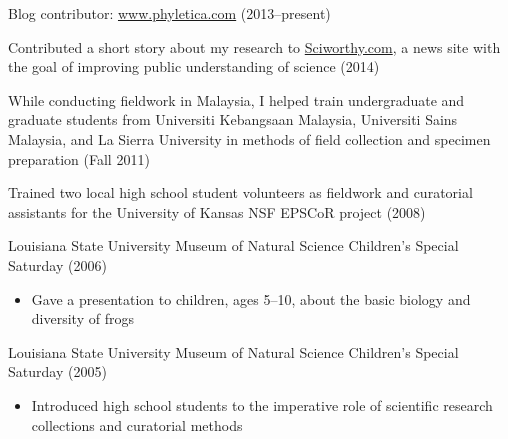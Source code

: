 \myHangIndent
Blog contributor:
\href{http://www.phyletica.com/?page_id=31}{www.phyletica.com} (2013--present)

\myHangIndent
Contributed a short story about my research to
\href{http://sciworthy.com/science-news/science-authors/whos-the-living-fossil/}{Sciworthy.com},
a news site with the goal of improving public understanding of science (2014)

\myHangIndent
While conducting fieldwork in Malaysia, I helped train undergraduate and
graduate students from Universiti Kebangsaan Malaysia, Universiti Sains
Malaysia, and La Sierra University in methods of field collection and specimen
preparation (Fall 2011)

\myHangIndent
Trained two local high school student volunteers as fieldwork and curatorial
assistants for the University of Kansas NSF EPSCoR project (2008)

\myHangIndent
Louisiana State University Museum of Natural Science Children's Special
Saturday (2006)
\begin{itemize}
    \item Gave a presentation to children, ages 5--10, about the basic biology
        and diversity of frogs
\end{itemize}

\myHangIndent
Louisiana State University Museum of Natural Science Children's Special
Saturday (2005)
\begin{itemize}
    \item Introduced high school students to the imperative role of scientific
        research collections and curatorial methods
\end{itemize}

